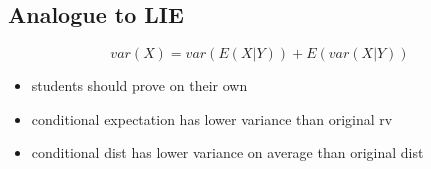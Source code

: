 \subsection{Analogue to LIE}

     \[var(X) = var(E(X|Y)) + E(var(X|Y))\]
\begin{itemize}
\item students should prove on their own
\item conditional expectation has lower variance than original rv
\item conditional dist has lower variance on average than original
         dist
\end{itemize}
         
